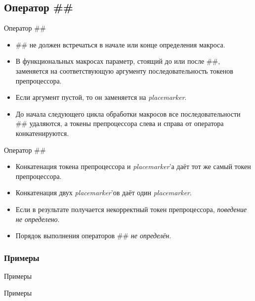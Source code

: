     \subsection{Оператор \#\#}
    \begin{frame}{Оператор \#\#}
        \begin{itemize}
            \item \#\# не должен встречаться в начале или конце определения макроса.
            \item В функциональных макросах параметр, стоящий до или после \#\#,
                заменяется на соответствующую аргументу последовательность токенов препроцессора.
            \item Если аргумент пустой, то он заменяется на \textit{placemarker}.
            \item До начала следующего цикла обработки макросов все последовательности
                \#\# удаляются, а токены препроцессора слева и справа от оператора конкатенируются.
        \end{itemize}
    \end{frame}
    \begin{frame}{Оператор \#\#}
        \begin{itemize}
            \item Конкатенация токена препроцессора и \textit{placemarker}'а даёт тот же самый токен препроцессора.
            \item Конкатенация двух \textit{placemarker}'ов даёт один \textit{placemarker}.
            \item Если в результате получается некорректный токен препроцессора, \textit{поведение не определено}.
            \item Порядок выполнения операторов \#\# \textit{не определён}.
        \end{itemize}
    \end{frame}
    \subsubsection{Примеры}
    \begin{frame}{Примеры}
        
    \end{frame}
    \begin{frame}{Примеры}
        
    \end{frame}

